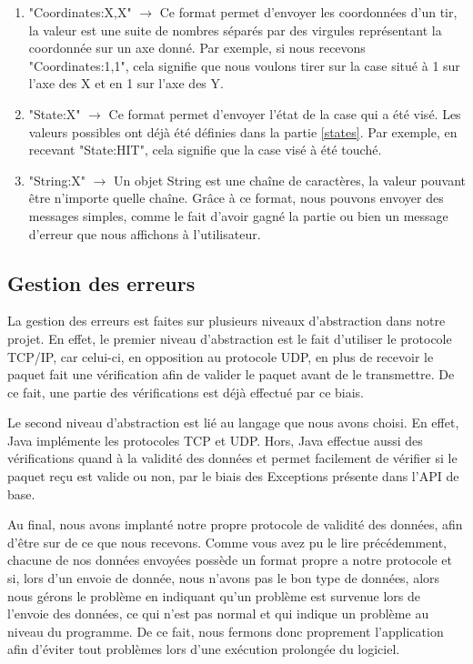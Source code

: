 			\begin{enumerate}
				\item "Coordinates:X,X" $\rightarrow$ Ce format permet d'envoyer les coordonnées d'un tir, la valeur est une suite de nombres séparés par des virgules représentant la coordonnée sur un axe donné. Par exemple, si nous recevons "Coordinates:1,1", cela signifie que nous voulons tirer sur la case situé à 1 sur l'axe des X et en 1 sur l'axe des Y.
			 
				\item "State:X" $\rightarrow$ Ce format permet d'envoyer l'état de la case qui a été visé. Les valeurs possibles ont déjà été définies dans la partie \ref{states}. Par exemple, en recevant "State:HIT", cela signifie que la case visé à été touché.
				
				\item "String:X" $\rightarrow$ Un objet String est une chaîne de caractères, la valeur pouvant être n'importe quelle chaîne. Grâce à ce format, nous pouvons envoyer des messages simples, comme le fait d'avoir gagné la partie ou bien un message d'erreur que nous affichons à l'utilisateur. 
				
			\end{enumerate}
			

\subsection{Gestion des erreurs}
	La gestion des erreurs est faites sur plusieurs niveaux d'abstraction dans notre projet. En effet, le premier niveau d'abstraction est le fait d'utiliser le protocole TCP/IP, car celui-ci, en opposition au protocole UDP, en plus de recevoir le paquet fait une vérification afin de valider le paquet avant de le transmettre. De ce fait, une partie des vérifications est déjà effectué par ce biais.\newline
	
	Le second niveau d'abstraction est lié au langage que nous avons choisi. En effet, Java implémente les protocoles TCP et UDP. Hors, Java effectue aussi des vérifications quand à la validité des données et permet facilement de vérifier si le paquet reçu est valide ou non, par le biais des Exceptions présente dans l'API de base.\newline
	
	Au final, nous avons implanté notre propre protocole de validité des données, afin d'être sur de ce que nous recevons. Comme vous avez pu le lire précédemment, chacune de nos données envoyées possède un format propre a notre protocole et si, lors d'un envoie de donnée, nous n'avons pas le bon type de données, alors nous gérons le problème en indiquant qu'un problème est survenue lors de l'envoie des données, ce qui n'est pas normal et qui indique un problème au niveau du programme. De ce fait, nous fermons donc proprement l'application afin d'éviter tout problèmes lors d'une exécution prolongée du logiciel.
